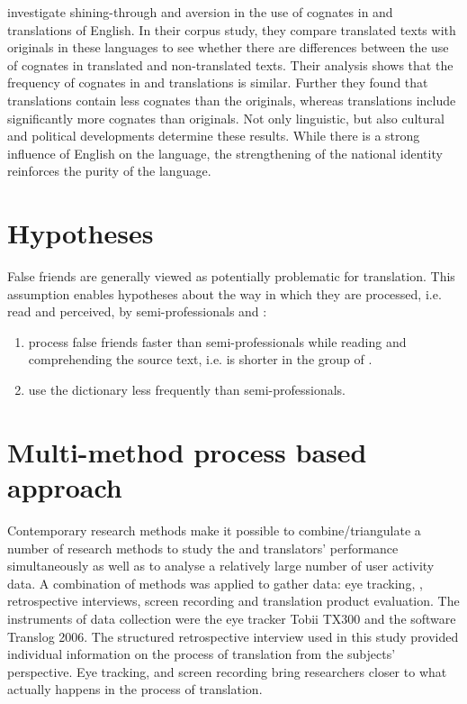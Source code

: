 \documentclass[output=paper]{langsci/langscibook.cls}
\begin{document}
\citet{Vintar2005} investigate shining-through and aversion in the use of cognates in  and  translations of English. In their corpus study, they compare translated texts with originals in these languages to see whether there are differences between the use of cognates in translated and non-translated texts. Their analysis shows that the frequency of cognates in  and  translations is similar. Further they found that  translations contain less cognates than the  originals, whereas  translations include significantly more cognates than  originals. Not only linguistic, but also cultural and political developments determine these results. While there is a strong influence of English on the  language, the strengthening of the  national identity reinforces the purity of the language. 

\section{Hypotheses}

False friends are generally viewed as potentially problematic for translation. This assumption enables hypotheses about the way in which they are processed, i.e. read and perceived, by semi-professionals and :  

\begin{enumerate}
 \item {} process false friends faster than semi-professionals while reading and comprehending the source text, i.e.  is shorter in the group of .
 \item {} use the dictionary less frequently than semi-professionals.
\end{enumerate}


\section{Multi-method process based approach}

Contemporary research methods make it possible to combine/triangulate a number of research methods to study the  and translators' performance simultaneously as well as to analyse a relatively large number of user activity data. A combination of methods was applied to gather data: eye tracking, , retrospective interviews, screen recording and translation product evaluation. The instruments of data collection were the eye tracker Tobii TX300 and the  software Translog 2006. The structured retrospective interview used in this study provided individual information on the process of translation from the subjects' perspective. Eye tracking,  and screen recording bring researchers closer to what actually happens in the process of translation. 
\end{document}
